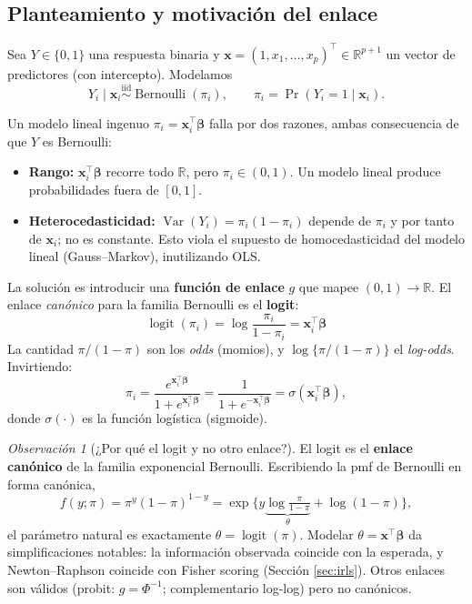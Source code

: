 \documentclass[11pt]{article}
\theoremstyle{plain}
\theoremstyle{definition}
\theoremstyle{remark}
\newtheorem{observacion}[teorema]{Observación}
\newcommand{\R}{\mathbb{R}}
\newcommand{\Var}{\operatorname{Var}}
\newcommand{\logit}{\operatorname{logit}}
\newcommand{\bbeta}{\bm{\beta}}
\newcommand{\bx}{\bm{x}}
\newcommand{\iid}{\overset{\text{iid}}{\sim}}
\newcommand{\Bern}{\operatorname{Bernoulli}}
\begin{document}
\subsection{Planteamiento y motivación del enlace}

Sea $Y \in \{0,1\}$ una respuesta binaria y $\bx = (1, x_1, \dots, x_p)^\top
\in \R^{p+1}$ un vector de predictores (con intercepto). Modelamos
\[
  Y_i \mid \bx_i \iid \Bern(\pi_i), \qquad
  \pi_i = \Pr(Y_i = 1 \mid \bx_i).
\]

Un modelo lineal ingenuo $\pi_i = \bx_i^\top\bbeta$ falla por dos razones,
ambas consecuencia de que $Y$ es Bernoulli:

\begin{itemize}
  \item \textbf{Rango:} $\bx_i^\top\bbeta$ recorre todo $\R$, pero
        $\pi_i \in (0,1)$. Un modelo lineal produce probabilidades fuera de
        $[0,1]$.
  \item \textbf{Heterocedasticidad:} $\Var(Y_i) = \pi_i(1-\pi_i)$ depende de
        $\pi_i$ y por tanto de $\bx_i$; no es constante. Esto viola el supuesto
        de homocedasticidad del modelo lineal (Gauss--Markov), inutilizando OLS.
\end{itemize}

La solución es introducir una \textbf{función de enlace} $g$ que mapee
$(0,1) \to \R$. El enlace \emph{canónico} para la familia Bernoulli es el
\textbf{logit}:
\[
  \boxed{\;\logit(\pi_i)
  = \log\!\frac{\pi_i}{1-\pi_i}
  = \bx_i^\top \bbeta \;}
\]
La cantidad $\pi/(1-\pi)$ son los \emph{odds} (momios), y $\log\{\pi/(1-\pi)\}$
el \emph{log-odds}. Invirtiendo:
\[
  \pi_i = \frac{e^{\bx_i^\top\bbeta}}{1 + e^{\bx_i^\top\bbeta}}
  = \frac{1}{1 + e^{-\bx_i^\top\bbeta}}
  = \sigma(\bx_i^\top\bbeta),
\]
donde $\sigma(\cdot)$ es la función logística (sigmoide).

\begin{observacion}[¿Por qué el logit y no otro enlace?]
El logit es el \textbf{enlace canónico} de la familia exponencial Bernoulli.
Escribiendo la pmf de Bernoulli en forma canónica,
\[
  f(y;\pi) = \pi^y(1-\pi)^{1-y}
  = \exp\!\Big\{ y \underbrace{\log\tfrac{\pi}{1-\pi}}_{\theta}
  + \log(1-\pi) \Big\},
\]
el parámetro natural es exactamente $\theta = \logit(\pi)$. Modelar
$\theta = \bx^\top\bbeta$ da simplificaciones notables: la información observada
coincide con la esperada, y Newton--Raphson coincide con Fisher scoring
(Sección \ref{sec:irls}). Otros enlaces son válidos (probit: $g=\Phi^{-1}$;
complementario log-log) pero no canónicos.
\end{observacion}
\end{document}
